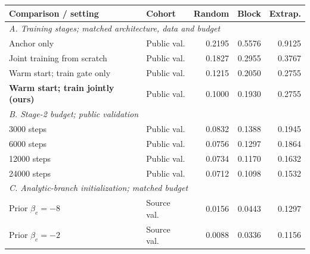 \footnotesize
\setlength{\tabcolsep}{3pt}
\begin{tabular*}{\linewidth}{@{\extracolsep{\fill}}llrrr@{}}\toprule
Comparison / setting & Cohort & Random & Block & Extrap. \\
\midrule
\multicolumn{5}{l}{\textit{A. Training stages; matched architecture, data and budget}} \\
Anchor only & Public val. & 0.2195 & 0.5576 & 0.9125 \\
Joint training from scratch & Public val. & 0.1827 & 0.2955 & 0.3767 \\
Warm start; train gate only & Public val. & 0.1215 & 0.2050 & 0.2755 \\
\textbf{Warm start; train jointly (ours)} & Public val. & 0.1000 & 0.1930 & 0.2755 \\
\midrule
\multicolumn{5}{l}{\textit{B. Stage-2 budget; public validation}} \\
3000 steps & Public val. & 0.0832 & 0.1388 & 0.1945 \\
6000 steps & Public val. & 0.0756 & 0.1297 & 0.1864 \\
12000 steps & Public val. & 0.0734 & 0.1170 & 0.1632 \\
24000 steps & Public val. & 0.0712 & 0.1098 & 0.1532 \\
\midrule
\multicolumn{5}{l}{\textit{C. Analytic-branch initialization; matched budget}} \\
Prior $\beta_e=-8$ & Source val. & 0.0156 & 0.0443 & 0.1297 \\
Prior $\beta_e=-2$ & Source val. & 0.0088 & 0.0336 & 0.1156 \\
\bottomrule\end{tabular*}
